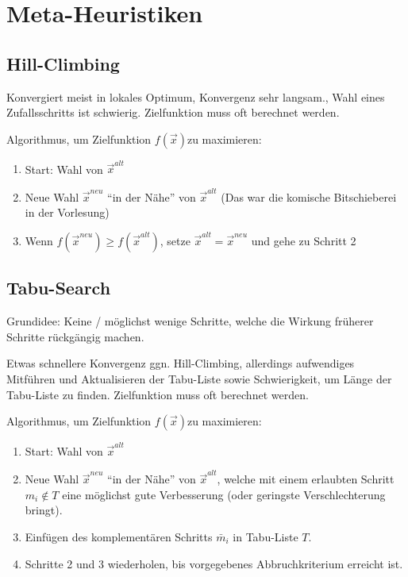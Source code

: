\section{Meta-Heuristiken}
\subsection{Hill-Climbing }
  Konvergiert meist in lokales Optimum, Konvergenz sehr langsam., Wahl eines Zufallsschritts ist schwierig. Zielfunktion muss oft berechnet werden.
  
  Algorithmus, um Zielfunktion $f(\vec{x})$zu maximieren:
  \begin{enumerate}
    \item Start: Wahl von $\vec{x}^{alt}$
    \item Neue Wahl $\vec{x}^{neu}$ "`in der Nähe"' von $\vec{x}^{alt}$ {\tiny (Das war die komische Bitschieberei in der Vorlesung)}
    \item Wenn $f(\vec{x}^{neu}) \geq f(\vec{x}^{alt})$, setze $\vec{x}^{alt} = \vec{x}^{neu}$ und gehe zu Schritt 2
  \end{enumerate}
  
 

\subsection{Tabu-Search }
  Grundidee: Keine / möglichst wenige Schritte, welche die Wirkung früherer Schritte rückgängig machen.
  
  Etwas schnellere Konvergenz ggn. Hill-Climbing, allerdings aufwendiges Mitführen und Aktualisieren der Tabu-Liste sowie Schwierigkeit, um Länge der Tabu-Liste zu finden. Zielfunktion muss oft berechnet werden.
  
  Algorithmus, um Zielfunktion $f(\vec{x})$zu maximieren:
  \begin{enumerate}
    \item Start: Wahl von $\vec{x}^{alt}$
    \item Neue Wahl $\vec{x}^{neu}$ "`in der Nähe"' von $\vec{x}^{alt}$, welche mit einem erlaubten Schritt $m_i \notin T$ eine möglichst gute Verbesserung (oder geringste Verschlechterung bringt).
    \item Einfügen des komplementären Schritts $\bar{m}_i$ in Tabu-Liste $T$.
    \item Schritte 2 und 3 wiederholen, bis vorgegebenes Abbruchkriterium erreicht ist.
  \end{enumerate}


